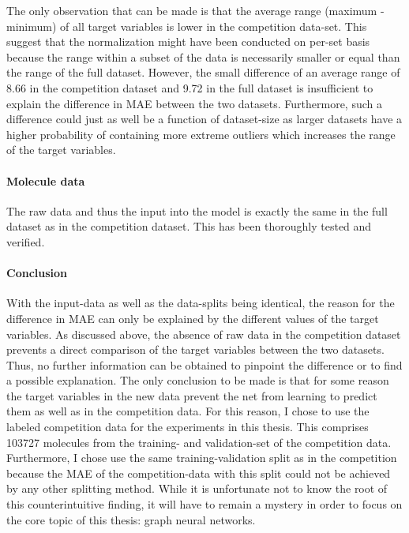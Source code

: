 The only observation that can be made is that the average range (maximum - minimum) of all target variables is lower in the competition data-set. This suggest that the normalization might have been conducted on per-set basis because the range within a subset of the data is necessarily smaller or equal than the range of the full dataset. However, the small difference of an average range of 8.66 in the competition dataset and 9.72 in the full dataset is insufficient to explain the difference in MAE between the two datasets. Furthermore, such a difference could just as well be a function of dataset-size as larger datasets have a higher probability of containing more extreme outliers which increases the range of the target variables.

\paragraph{Molecule data}

The raw data and thus the input into the model is exactly the same in the full dataset as in the competition dataset. This has been thoroughly tested and verified.

\paragraph{Conclusion}

With the input-data as well as the data-splits being identical, the reason for the difference in MAE can only be explained by the different values of the target variables. As discussed above, the absence of raw data in the competition dataset prevents a direct comparison of the target variables between the two datasets. Thus, no further information can be obtained to pinpoint the difference or to find a possible explanation. The only conclusion to be made is that for some reason the target variables in the new data prevent the net from learning to predict them as well as in the competition data. For this reason, I chose to use the labeled competition data for the experiments in this thesis. This comprises 103727 molecules from the training- and validation-set of the competition data.
Furthermore, I chose use the same training-validation split as in the competition because the MAE of the competition-data with this split could not be achieved by any other splitting method. While it is unfortunate not to know the root of this counterintuitive finding, it will have to remain a mystery in order to focus on the core topic of this thesis: graph neural networks. 

